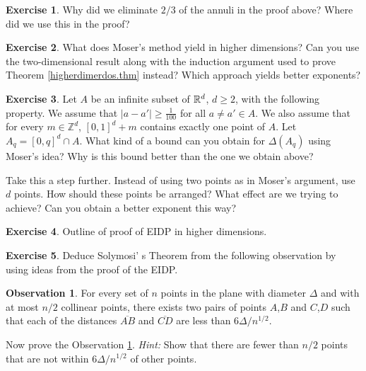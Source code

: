 \documentclass[]{amsart}
\numberwithin{equation}{section}
\theoremstyle{plain}
\theoremstyle{definition}
\newtheorem{exercise}{Exercise}[section]
\newtheorem{obs}{Observation}
\theoremstyle{remark}
\begin{document}
\bigskip

\begin{exercise} \label{ex2.1}
Why did we eliminate $2/3$ of the annuli
in the proof above? Where did we use this in the proof?
\end{exercise}

\begin{exercise} \label{ex2.2}
What does Moser's method yield in higher
dimensions? Can you use the two-dimensional result along with the
induction argument used to prove Theorem \ref{higherdimerdos.thm} instead? Which
approach yields better exponents? \end{exercise}

\begin{exercise} \label{ex2.3}
Let $A$ be an infinite subset of ${\Bbb
R}^d$, $d \ge 2$, with the following property. We assume that
$|a-a'| \ge \frac{1}{100}$ for all $a \not=a' \in A$. We also
assume that for every $m \in \mathbb{Z}^d$, ${[0,1]}^d+m$ contains
exactly one point of $A$. Let $A_q={[0,q]}^d \cap A$. What kind of
a bound can you obtain for $\Delta(A_q)$ using Moser's idea? Why
is this bound better than the one we obtain above?

Take this a step further. Instead of using two points as in
Moser's argument, use $d$ points. How should these points be
arranged? What effect are we trying to achieve? Can you obtain a
better exponent this way? \end{exercise}

\begin{exercise} \label{ex2.4}
Outline of proof of EIDP in higher
dimensions.
\end{exercise}

\begin{exercise} \label{ex2.5}
Deduce Solymosi' s Theorem from the following observation by using ideas from the proof of the EIDP.

\begin{obs} \label{obs1}
For every set of $n$ points in the plane with diameter $\Delta$ and with at most $n/2$ collinear points, there exists two pairs of points $A$,$B$ and $C$,$D$ such that each of the distances $\overline{AB}$ and $\overline{CD}$ are less than $6\Delta/n^{1/2}$.
\end{obs}

Now prove the Observation \ref{obs1}.  {\it Hint:}  Show that there are fewer than $n/2$ points that are not within $6\Delta/n^{1/2}$ of other points.

\end{exercise}
\end{document}
